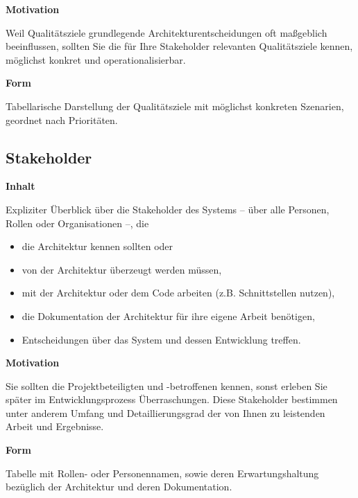 \documentclass[
]{article}
\begin{document}
\textbf{Motivation}

Weil Qualitätsziele grundlegende Architekturentscheidungen oft
maßgeblich beeinflussen, sollten Sie die für Ihre Stakeholder relevanten
Qualitätsziele kennen, möglichst konkret und operationalisierbar.

\textbf{Form}

Tabellarische Darstellung der Qualitätsziele mit möglichst konkreten
Szenarien, geordnet nach Prioritäten.

\hypertarget{_stakeholder}{%
\subsection{Stakeholder}\label{_stakeholder}}

\textbf{Inhalt}

Expliziter Überblick über die Stakeholder des Systems -- über alle
Personen, Rollen oder Organisationen --, die

\begin{itemize}
\item
  die Architektur kennen sollten oder
\item
  von der Architektur überzeugt werden müssen,
\item
  mit der Architektur oder dem Code arbeiten (z.B. Schnittstellen
  nutzen),
\item
  die Dokumentation der Architektur für ihre eigene Arbeit benötigen,
\item
  Entscheidungen über das System und dessen Entwicklung treffen.
\end{itemize}

\textbf{Motivation}

Sie sollten die Projektbeteiligten und -betroffenen kennen, sonst
erleben Sie später im Entwicklungsprozess Überraschungen. Diese
Stakeholder bestimmen unter anderem Umfang und Detaillierungsgrad der
von Ihnen zu leistenden Arbeit und Ergebnisse.

\textbf{Form}

Tabelle mit Rollen- oder Personennamen, sowie deren Erwartungshaltung
bezüglich der Architektur und deren Dokumentation.
\end{document}

